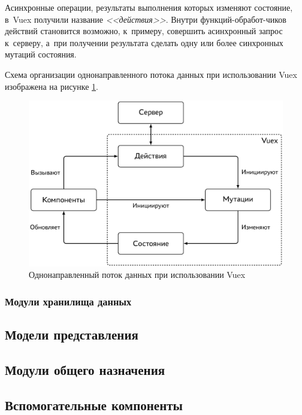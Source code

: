 Асинхронные операции, результаты выполнения которых изменяют состояние, в~Vuex получили название \emph{<<действия>>}. Внутри функций-обработ-чиков действий становится возможно, к~примеру, совершить асинхронный запрос к~серверу, а~при получении результата сделать одну или более синхронных мутаций состояния.

Схема организации однонаправленного потока данных при использовании Vuex изображена на рисунке \ref{fig:vuex-oneway-data-flow}.

\begin{figure}[h!]
  \centering
  \setlength{\fboxsep}{5pt}
  \includegraphics[width=.9\textwidth]{img/tikz/vuex-oneway-data-flow/pic}
  \vspace*{12pt}
  \caption{Однонаправленный поток данных при использовании Vuex}\label{fig:vuex-oneway-data-flow}
\end{figure}


\subsubsection{Модули хранилища данных}



\subsection{Модели представления}



\subsection{Модули общего назначения}



\subsection{Вспомогательные компоненты}

\newpage
